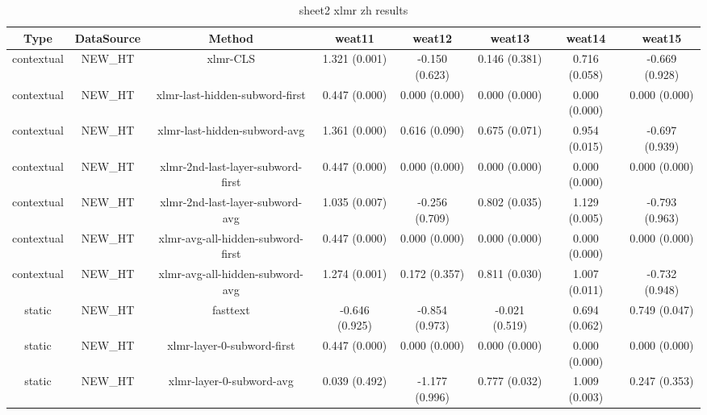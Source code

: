 \begin{sidewaystable}[htb]
    \centering
    \caption{sheet2 xlmr zh results}
    \label{appendix_tab:sheet2_xlmr_zh_results}
    \small
    \begin{tabular}{@{}cccccccc@{}}
        \toprule
        Type & DataSource & Method & weat11 & weat12 & weat13 & weat14 & weat15 \\
        \midrule
        contextual & NEW\_HT & xlmr-CLS & 1.321 (0.001) & -0.150 (0.623) & 0.146 (0.381) & 0.716 (0.058) & -0.669 (0.928) \\
        contextual & NEW\_HT & xlmr-last-hidden-subword-first & 0.447 (0.000) & 0.000 (0.000) & 0.000 (0.000) & 0.000 (0.000) & 0.000 (0.000) \\
        contextual & NEW\_HT & xlmr-last-hidden-subword-avg & 1.361 (0.000) & 0.616 (0.090) & 0.675 (0.071) & 0.954 (0.015) & -0.697 (0.939) \\
        contextual & NEW\_HT & xlmr-2nd-last-layer-subword-first & 0.447 (0.000) & 0.000 (0.000) & 0.000 (0.000) & 0.000 (0.000) & 0.000 (0.000) \\
        contextual & NEW\_HT & xlmr-2nd-last-layer-subword-avg & 1.035 (0.007) & -0.256 (0.709) & 0.802 (0.035) & 1.129 (0.005) & -0.793 (0.963) \\
        contextual & NEW\_HT & xlmr-avg-all-hidden-subword-first & 0.447 (0.000) & 0.000 (0.000) & 0.000 (0.000) & 0.000 (0.000) & 0.000 (0.000) \\
        contextual & NEW\_HT & xlmr-avg-all-hidden-subword-avg & 1.274 (0.001) & 0.172 (0.357) & 0.811 (0.030) & 1.007 (0.011) & -0.732 (0.948) \\
        static & NEW\_HT & fasttext & -0.646 (0.925) & -0.854 (0.973) & -0.021 (0.519) & 0.694 (0.062) & 0.749 (0.047) \\
        static & NEW\_HT & xlmr-layer-0-subword-first & 0.447 (0.000) & 0.000 (0.000) & 0.000 (0.000) & 0.000 (0.000) & 0.000 (0.000) \\
        static & NEW\_HT & xlmr-layer-0-subword-avg & 0.039 (0.492) & -1.177 (0.996) & 0.777 (0.032) & 1.009 (0.003) & 0.247 (0.353) \\
        \bottomrule
    \end{tabular}
\end{sidewaystable}